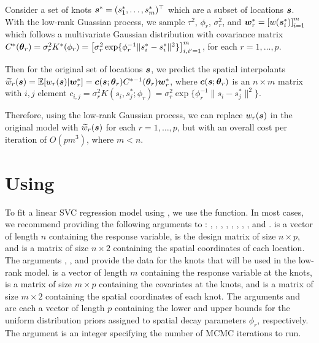 Consider a set of knots $\boldsymbol{s}^* = (s_1^*, \dots, s_m^*)^\top$ which are a subset of locations $\boldsymbol{s}$. With the low-rank Guassian process, we sample $\tau^2$, $\phi_r$, $\sigma_r^2$, and $\boldsymbol{w}_r^* = \left[w(\boldsymbol{s}_i^*)\right]_{i=1}^m$ which follows a multivariate Gaussian distribution with covariance matrix $C^*(\boldsymbol{\theta}_r) = \sigma_r^2 K^*(\phi_r) = \left[ \sigma_r^2 \exp\{ \phi_r^{-1} \| s_{i}^* - s_{i}^* \|^2 \} \right]_{i, i' = 1}^m$, for each $r = 1, \dots, p$.

Then for the original set of locations $\boldsymbol{s}$, we predict the spatial interpolants $\widetilde{w}_r(\boldsymbol{s}) = \mathbb{E}[w_r(\boldsymbol{s})|\boldsymbol{w}_r^*] = \boldsymbol{c} (\boldsymbol{s}; \boldsymbol{\theta}_r) C^{*-1}(\boldsymbol{\theta}_r)\boldsymbol{w}_r^*$, where $\boldsymbol{c} (\boldsymbol{s}; \boldsymbol{\theta}_r)$ is an $n \times m$ matrix with $i, j$ element $c_{i, j} = \sigma_r^2 K(s_i, s_j^*; \phi_r) = \sigma_r^2 \exp\{\phi_r^{-1}\|s_i-s_j^*\|^2\}$.

Therefore, using the low-rank Gaussian process, we can replace $w_r(\boldsymbol{s})$ in the original model with $\widetilde{w}_r(\boldsymbol{s})$ for each $r = 1, \dots, p$, but with an overall cost per iteration of $O(pm^3)$, where $m < n$.

\section{Using }
\label{sec:using}

To fit a linear SVC regression model using , we use the  function. In most cases, we recommend providing the following arguments to : , , , , , , , , and .  is a vector of length $n$ containing the response variable,  is the design matrix of size $n \times p$, and  is a matrix of size $n \times 2$ containing the spatial coordinates of each location. The arguments , , and  provide the data for the knots that will be used in the low-rank model.  is a vector of length $m$ containing the response variable at the knots,  is a matrix of size $m \times p$ containing the covariates at the knots, and  is a matrix of size $m \times 2$ containing the spatial coordinates of each knot. The arguments  and  are each a vector of length $p$ containing the lower and upper bounds for the uniform distribution priors assigned to spatial decay parameters $\phi_r$, respectively. The argument  is an integer specifying the number of MCMC iterations to run.

